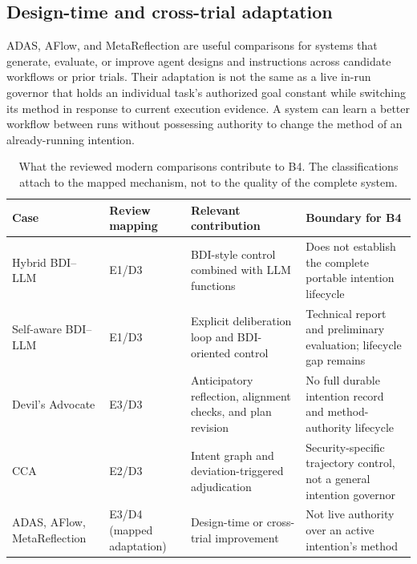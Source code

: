\subsection{Design-time and cross-trial adaptation}

ADAS, AFlow, and MetaReflection are useful comparisons for systems that generate, evaluate, or improve agent designs and instructions across candidate workflows or prior trials. Their adaptation is not the same as a live in-run governor that holds an individual task's authorized goal constant while switching its method in response to current execution evidence. A system can learn a better workflow between runs without possessing authority to change the method of an already-running intention.\autocite{hu2024adas,zhang2024aflow,gupta2024metareflection}

\begin{table}[tbp]
\centering
\caption{What the reviewed modern comparisons contribute to B4. The classifications attach to the mapped mechanism, not to the quality of the complete system.}
\label{tab:ch15-modern-comparison}
\small
\begin{tabularx}{\textwidth}{>{\RaggedRight\arraybackslash}p{}>{\RaggedRight\arraybackslash}p{}>{\RaggedRight\arraybackslash}X>{\RaggedRight\arraybackslash}X}
\toprule
\textbf{Case} & \textbf{Review mapping} & \textbf{Relevant contribution} & \textbf{Boundary for B4} \\
\midrule
Hybrid BDI--LLM & E1/D3 & BDI-style control combined with LLM functions & Does not establish the complete portable intention lifecycle \\
Self-aware BDI--LLM & E1/D3 & Explicit deliberation loop and BDI-oriented control & Technical report and preliminary evaluation; lifecycle gap remains \\
Devil's Advocate & E3/D3 & Anticipatory reflection, alignment checks, and plan revision & No full durable intention record and method-authority lifecycle \\
CCA & E2/D3 & Intent graph and deviation-triggered adjudication & Security-specific trajectory control, not a general intention governor \\
ADAS, AFlow, MetaReflection & E3/D4 (mapped adaptation) & Design-time or cross-trial improvement & Not live authority over an active intention's method \\
\bottomrule
\end{tabularx}
\end{table}

